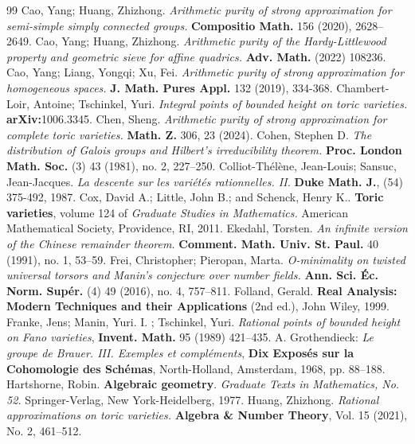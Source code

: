\documentclass[11pt,letterpaper]{amsart}
\theoremstyle{plain}
\numberwithin{equation}{section}
\theoremstyle{definition}
\theoremstyle{remark}
\begin{document}
\begin{thebibliography}{99}
	 Cao, Yang; Huang, Zhizhong. \emph{Arithmetic purity of strong approximation for semi-simple simply connected groups.}	\textbf{Compositio Math.} 156 (2020), 2628–2649. 
	 Cao, Yang; Huang, Zhizhong. \emph{Arithmetic purity of the Hardy-Littlewood property and geometric sieve for affine quadrics.} \textbf{Adv. Math.} (2022) 108236.
	 Cao, Yang; Liang, Yongqi; Xu, Fei. \emph{Arithmetic purity of strong approximation for homogeneous spaces.} \textbf{J. Math. Pures Appl.} 132 (2019), 334-368.
	 Chambert-Loir, Antoine; Tschinkel, Yuri. \emph{Integral points of bounded height on toric varieties.} \textbf{arXiv:}1006.3345.
	 Chen, Sheng. {\em Arithmetic purity of strong approximation for complete toric varieties.} \textbf{Math. Z.} 306, 23 (2024).
	 Cohen, Stephen D. \emph{The distribution of Galois groups and Hilbert's irreducibility theorem.} \textbf{Proc. London Math. Soc.} (3) 43 (1981), no. 2, 227–250.
	  Colliot-Thél\`ene, Jean-Louis;  Sansuc, Jean-Jacques. \emph{La descente sur les variétés rationnelles. II.}  \textbf{Duke Math. J.}, (54) 375-492, 1987.
	  Cox, David A.; Little, John B.; and Schenck, Henry K.. \textbf{Toric varieties}, volume 124 of \emph{Graduate Studies in Mathematics.} American Mathematical Society, Providence, RI, 2011.
	 Ekedahl, Torsten. \emph{An infinite version of the Chinese remainder theorem.} \textbf{Comment. Math. Univ. St. Paul.} 40 (1991), no. 1, 53–59.
	 Frei, Christopher; Pieropan, Marta. \emph{O-minimality on twisted universal torsors and Manin's conjecture over number fields.} \textbf{Ann. Sci. Éc. Norm. Supér.} (4) 49 (2016), no. 4, 757–811. 
	 Folland, Gerald. \textbf{Real Analysis: Modern Techniques and their Applications} (2nd ed.), John Wiley, 1999.
	 Franke, Jens; Manin,  Yuri. I. ; Tschinkel, Yuri. \emph{Rational points of bounded height on Fano
	varieties}, \textbf{Invent. Math.} 95 (1989) 421–435.
 A. Grothendieck: \emph{Le groupe de Brauer. III. Exemples et compléments}, \textbf{Dix Exposés sur la Cohomologie des Schémas}, North-Holland, Amsterdam, 1968, pp. 88–188.
	  Hartshorne, Robin. \textbf{Algebraic geometry}. \emph{Graduate Texts in Mathematics, No. 52.} Springer-Verlag, New York-Heidelberg, 1977. 
	 Huang, Zhizhong. \emph{Rational approximations on toric varieties.} \textbf{Algebra \& Number Theory}, Vol. 15 (2021), No. 2, 461–512.

\end{thebibliography}
\end{document}
